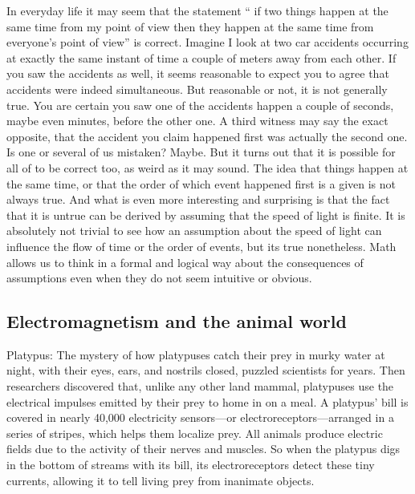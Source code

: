 In everyday life it may seem that the statement "` if two things happen at the same time from my point of view then they happen at the same time from everyone's point of view"' is correct. Imagine I look at two car accidents occurring at exactly the same instant of time a couple of meters away from each other. If you saw the accidents as well, it seems reasonable to expect you to agree that accidents were indeed simultaneous. But reasonable or not, it is not generally true. You are certain you saw one of the accidents happen a couple of seconds, maybe even minutes, before the other one. A third witness may say the exact opposite, that the accident you claim happened first was actually the second one. Is one or several of us mistaken? Maybe. But it turns out that it is possible for all of to be correct too, as weird as it may sound. The idea that things happen at the same time, or that the order of which event happened first is a given is not always true. And what is even more interesting and surprising is that the fact that it is untrue can be derived by assuming that the speed of light is finite. It is absolutely not trivial to see how an assumption about the speed of light can influence the flow of time or the order of events, but its true nonetheless. Math allows us to think in a formal and logical way about the consequences of assumptions even when they do not seem intuitive or obvious. 

\subsection{Electromagnetism and the animal world}

Platypus:
The mystery of how platypuses catch their prey in murky water at night, with their eyes, ears, and nostrils closed, puzzled scientists for years. Then researchers discovered that, unlike any other land mammal, platypuses use the electrical impulses emitted by their prey to home in on a meal.
A platypus’ bill is covered in nearly 40,000 electricity sensors—or electroreceptors—arranged in a series of stripes, which helps them localize prey. All animals produce electric fields due to the activity of their nerves and muscles. So when the platypus digs in the bottom of streams with its bill, its electroreceptors detect these tiny currents, allowing it to tell living prey from inanimate objects.\\

